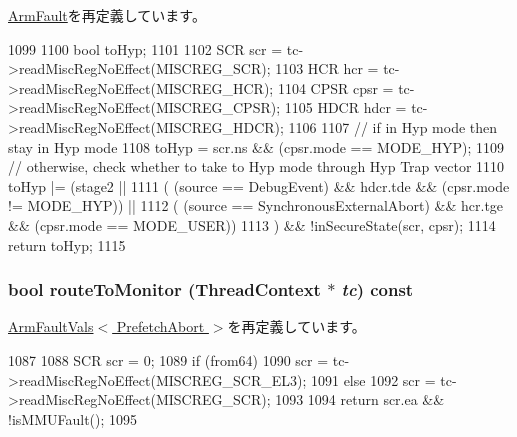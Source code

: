\hyperlink{classArmISA_1_1ArmFault_a6fa7b734487c2a8da04a28ace414a355}{ArmFault}を再定義しています。


\begin{DoxyCode}
1099 {
1100     bool toHyp;
1101 
1102     SCR  scr  = tc->readMiscRegNoEffect(MISCREG_SCR);
1103     HCR  hcr  = tc->readMiscRegNoEffect(MISCREG_HCR);
1104     CPSR cpsr = tc->readMiscRegNoEffect(MISCREG_CPSR);
1105     HDCR hdcr = tc->readMiscRegNoEffect(MISCREG_HDCR);
1106 
1107     // if in Hyp mode then stay in Hyp mode
1108     toHyp  = scr.ns && (cpsr.mode == MODE_HYP);
1109     // otherwise, check whether to take to Hyp mode through Hyp Trap vector
1110     toHyp |= (stage2 ||
1111                 ( (source ==               DebugEvent) && hdcr.tde && (cpsr.mode 
      !=  MODE_HYP)) ||
1112                 ( (source == SynchronousExternalAbort) && hcr.tge  && (cpsr.mode 
      == MODE_USER))
1113              ) && !inSecureState(scr, cpsr);
1114     return toHyp;
1115 }
\end{DoxyCode}
\hypertarget{classArmISA_1_1PrefetchAbort_afd7a21fdb010230ad53094254739dde8}{
\subsubsection[{routeToMonitor}]{\setlength{\rightskip}{0pt plus 5cm}bool routeToMonitor ({\bf ThreadContext} $\ast$ {\em tc}) const}}
\label{classArmISA_1_1PrefetchAbort_afd7a21fdb010230ad53094254739dde8}


\hyperlink{classArmISA_1_1ArmFaultVals_a9a0a467b98f43890c1d89d1d59a5923c}{ArmFaultVals$<$ PrefetchAbort $>$}を再定義しています。


\begin{DoxyCode}
1087 {
1088     SCR scr = 0;
1089     if (from64)
1090         scr = tc->readMiscRegNoEffect(MISCREG_SCR_EL3);
1091     else
1092         scr = tc->readMiscRegNoEffect(MISCREG_SCR);
1093 
1094     return scr.ea && !isMMUFault();
1095 }
\end{DoxyCode}


